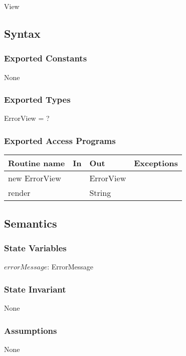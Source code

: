 \documentclass[12pt]{article}
\begin{document}
View

\subsection* {Syntax}

\subsubsection* {Exported Constants}

None

\subsubsection* {Exported Types}

ErrorView = ?

\subsubsection* {Exported Access Programs}

\begin{tabular}{| l | l | l | p{5cm} |}
\hline
\textbf{Routine name} & \textbf{In} & \textbf{Out} & \textbf{Exceptions}\\
\hline
new ErrorView &  & ErrorView & \\
\hline
render & & String & \\
\hline
\end{tabular}

\subsection* {Semantics}

\subsubsection* {State Variables}

$errorMessage$: ErrorMessage

\subsubsection* {State Invariant}

None

\subsubsection* {Assumptions}

None
\end{document}
